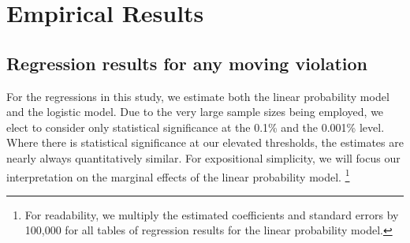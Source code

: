 \section{Empirical Results}
\label{sec:Empirical}


\subsection{Regression results for any moving violation}
\label{sec:Empirical_all}









For the regressions in this study, we estimate both the linear probability model and the logistic model. 
%
Due to the very large sample sizes being employed, 
we elect to consider only statistical significance at the 0.1\% and the 0.001\% level. 
%
Where there is statistical significance at our elevated thresholds, 
the estimates are nearly always quantitatively similar. 
For expositional simplicity, we will focus our interpretation on 
the marginal effects of the linear probability model.%
\footnote{%
For readability, we multiply the estimated coefficients and standard errors by 100,000 
for all tables of regression results for the linear probability model.
}


